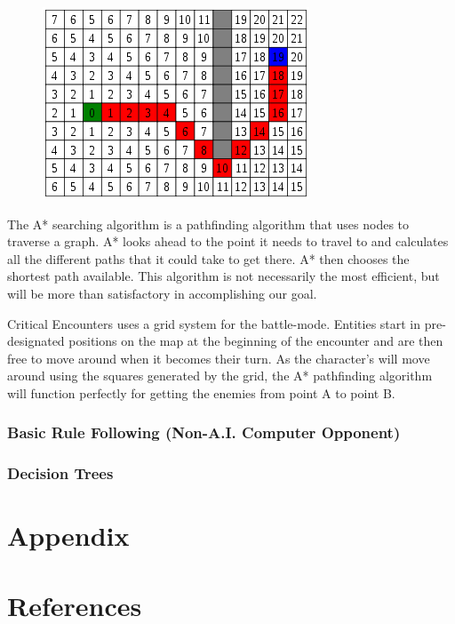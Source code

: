 \documentclass[12pt,a4paper]{report}
\begin{document}
			\begin{figure}
				\includegraphics[scale=0.5]{aStar}
			\end{figure}
			The A* searching algorithm is a pathfinding algorithm that uses nodes to traverse a graph. A* looks ahead to the point it needs to travel to and calculates all the different paths that it could take to get there. A* then chooses the shortest path available. This algorithm is not necessarily the most efficient, but will be more than satisfactory in accomplishing our goal.
			
			Critical Encounters uses a grid system for the battle-mode. Entities start in pre-designated positions on the map at the beginning of the encounter and are then free to move around when it becomes their turn. As the character's will move around using the squares generated by the grid, the A* pathfinding algorithm will function perfectly for getting the enemies from point A to point B.
		\subsection{Basic Rule Following (Non-A.I. Computer Opponent)}
		\subsection{Decision Trees}

\newpage
\chapter*{Appendix}

\newpage
{}
\listoffigures

\newpage
{}
\listoftables

\newpage
\chapter*{References}
\end{document}
